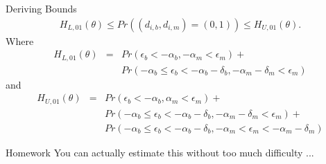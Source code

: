 \documentclass[xcolor=pdftex,dvipsnames,table,mathserif]{beamer}
\begin{document}
\begin{frame}[fragile]{Deriving Bounds}
\begin{eqnarray*}
H_{L,01}(\theta) \leq Pr ((d_{i,b}, d_{i,m}) = (0, 1)) \leq  H_{U,01}(\theta).
\end{eqnarray*}
Where
\begin{eqnarray*}
H_{L,01}(\theta) &=&Pr(\epsilon_{b} < -\alpha_b, -\alpha_m < \epsilon_m) +\\
&& Pr( -\alpha_b \leq \epsilon_{b} < -\alpha_b - \delta_b, -\alpha_m - \delta_m < \epsilon_m)
\end{eqnarray*}
and
\begin{eqnarray*}
H_{U,01}(\theta) &=&Pr(\epsilon_{b} < -\alpha_b, \alpha_m < \epsilon_m) +\\
&& Pr( -\alpha_b \leq \epsilon_{b} < -\alpha_b - \delta_b, -\alpha_m - \delta_m < \epsilon_m) +\\
&& Pr( -\alpha_b \leq \epsilon_{b} < -\alpha_b - \delta_b, -\alpha_m < \epsilon_m < -\alpha_m - \delta_m) 
\end{eqnarray*}
\end{frame}







\begin{frame}[fragile]{Homework}
You can actually estimate this without too much difficulty ...
\end{frame}



%
\end{document}
